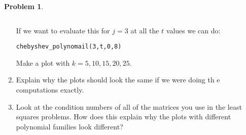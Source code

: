 \documentclass[12pt]{article}
\theoremstyle{definition}
\newtheorem{problem}{Problem}
\begin{document}
\begin{problem}
\begin{enumerate}
\begin{lstlisting}
        \end{lstlisting}

        If we want to evaluate this for $j=3$ at all the $t$ values we can do:
        \begin{lstlisting}
chebyshev_polynomail(3,t,0,8)
        \end{lstlisting} 

        Make a plot with $k=5,10,15,20,25$.

        \item Explain why the plots should look the same if we were doing th e computations exactly.
        
        \item Look at the condition numbers of all of the matrices you use in the least squares problems. 
        How does this explain why the plots with different polynomial families look different?

    \end{enumerate}

\end{problem}
\end{document}
